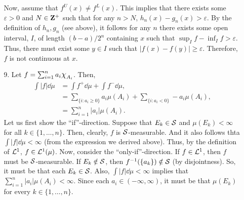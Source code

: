 \documentclass{article}
\newcommand{\eps}{\varepsilon}
\theoremstyle{remark}
\begin{document}
\begin{enumerate}[leftmargin=*]
    Now, assume that $f^U(x) \neq f^L(x)$. This implies that there exists some $\eps > 0$ and $N\in\mathbf{Z}^+$ such that for any $n > N$,
    $h_n(x) - g_n(x) > \eps$. By the definition of $h_n,g_n$ (see above), it follows for any $n$ there exists
    some open interval, $I$, of length $(b-a)/2^n$ containing $x$ such that $\sup_I f - \inf_I f > \eps$. Thus, there must exist some $y\in I$
    such that $|f(x) - f(y)| \geq \eps$. Therefore, $f$ is not continuous at $x$. 
    \item[9.] Let $f = \sum_{i=1}^n a_i \mbox{\large$\chi$}_{A_i}$. Then, 
    \begin{align*}
        \int |f| \dd\mu &= \int f^+ \dd\mu + \int f^- \dd\mu, \\
        &= \sum_{\{i:a_i \geq 0 \}} a_i\mu(A_i) + \sum_{\{i:a_i < 0\}} -a_i \mu(A_i), \\
        &= \sum_{i=1}^n |a_i|\mu(A_i).
    \end{align*}
    Let us first show the ``if''-direction. Suppose that $E_k \in \mathcal{S}$ and $\mu(E_k) < \infty$ for all $k\in \{1,\ldots,n\}$. Then,
    clearly, $f$ is $\mathcal{S}$-measurable. And it also follows thta $\int |f| \dd\mu < \infty$ (from the expression we derived above).
    Thus, by the definition of $\mathcal{L}^1$, $f \in \mathcal{L}^1(\mu)$. 
    Now, consider the ``only-if''-direction. If $f \in \mathcal{L}^1$, then $f$ must be $\mathcal{S}$-measurable. If $E_k \notin \mathcal{S}$, then 
    $f^{-1}(\{a_k\}) \notin \mathcal{S}$ (by disjointness). So, it must be that each $E_k \in \mathcal{S}$. Also, $\int |f| \dd\mu < \infty$ 
    implies that $\sum_{i=1}^n |a_i|\mu(A_i) < \infty$. Since each $a_i \in (-\infty,\infty)$, it must be that $\mu(E_k)$ for 
    every $k\in \{1,\ldots,n\}$. 
\end{enumerate}
\end{document}
